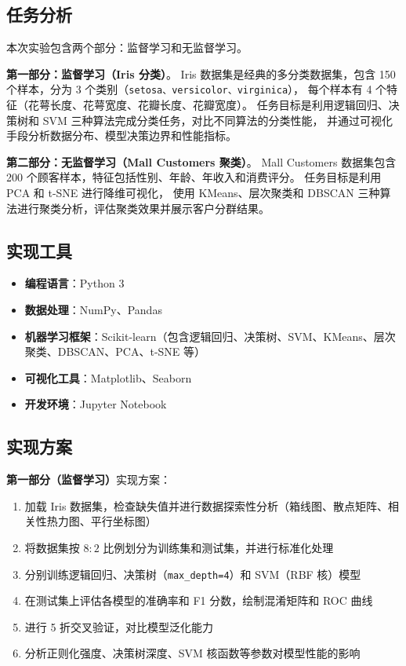 \documentclass[UTF8]{ctexart}
\begin{document}
\subsection{任务分析}

本次实验包含两个部分：监督学习和无监督学习。

\textbf{第一部分：监督学习（Iris 分类）}。
Iris 数据集是经典的多分类数据集，包含 150 个样本，分为 3 个类别（\texttt{setosa、versicolor、virginica}），
每个样本有 4 个特征（花萼长度、花萼宽度、花瓣长度、花瓣宽度）。
任务目标是利用逻辑回归、决策树和 SVM 三种算法完成分类任务，对比不同算法的分类性能，
并通过可视化手段分析数据分布、模型决策边界和性能指标。

\textbf{第二部分：无监督学习（Mall Customers 聚类）}。
Mall Customers 数据集包含 200 个顾客样本，特征包括性别、年龄、年收入和消费评分。
任务目标是利用 PCA 和 t-SNE 进行降维可视化，
使用 KMeans、层次聚类和 DBSCAN 三种算法进行聚类分析，评估聚类效果并展示客户分群结果。

\subsection{实现工具}

\begin{itemize}
\item \textbf{编程语言}：Python 3
\item \textbf{数据处理}：NumPy、Pandas
\item \textbf{机器学习框架}：Scikit-learn（包含逻辑回归、决策树、SVM、KMeans、层次聚类、DBSCAN、PCA、t-SNE 等）
\item \textbf{可视化工具}：Matplotlib、Seaborn
\item \textbf{开发环境}：Jupyter Notebook
\end{itemize}

\subsection{实现方案}

\textbf{第一部分（监督学习）}实现方案：
\begin{enumerate}
\item 加载 Iris 数据集，检查缺失值并进行数据探索性分析（箱线图、散点矩阵、相关性热力图、平行坐标图）
\item 将数据集按 $8:2$ 比例划分为训练集和测试集，并进行标准化处理
\item 分别训练逻辑回归、决策树（\texttt{max\_depth=4}）和 SVM（RBF 核）模型
\item 在测试集上评估各模型的准确率和 F1 分数，绘制混淆矩阵和 ROC 曲线
\item 进行 5 折交叉验证，对比模型泛化能力
\item 分析正则化强度、决策树深度、SVM 核函数等参数对模型性能的影响
\end{enumerate}
\end{document}

